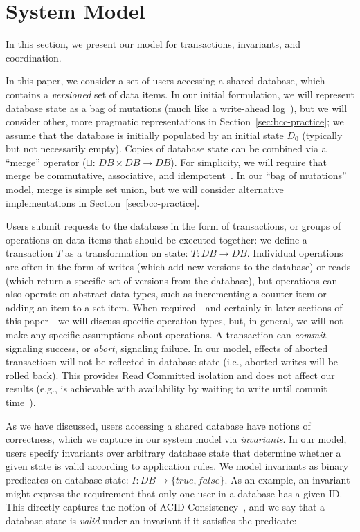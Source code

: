 
\section{System Model}
\label{sec:model}

In this section, we present our model for transactions, invariants,
and coordination.

 In this paper, we consider a set of users
accessing a shared database, which contains a \textit{versioned} set
of data items. In our initial formulation, we will represent database
state as a bag of mutations (much like a write-ahead
log~\cite{gray-book}), but we will consider other, more pragmatic
representations in Section~\ref{sec:bcc-practice}; we assume that the
database is initially populated by an initial state $D_0$ (typically
but not necessarily empty). Copies of database state can be combined
via a ``merge'' operator ($\sqcup$: $DB \times DB \rightarrow DB$).
For simplicity, we will require that merge be commutative,
associative, and idempotent~\cite{calm,crdt}. In our ``bag of
mutations'' model, merge is simple set union, but we will consider
alternative implementations in Section~\ref{sec:bcc-practice}.

 Users submit requests to the database in the
form of transactions, or groups of operations on data items that
should be executed together: we define a transaction $T$ as a
transformation on state: $T: DB \rightarrow DB$. Individual operations
are often in the form of writes (which add new versions to the
database) or reads (which return a specific set of versions from the
database), but operations can also operate on abstract data types,
such as incrementing a counter item or adding an item to a set
item. When required---and certainly in later sections of this
paper---we will discuss specific operation types, but, in general, we
will not make any specific assumptions about operations. A transaction
can \textit{commit}, signaling success, or \textit{abort}, signaling
failure. In our model, effects of aborted transactiosn will not be
reflected in database state (i.e., aborted writes will be rolled
back). This provides Read Committed isolation and does not affect our
results (e.g., is achievable with availability by waiting to write
until commit time~\cite{hat-vldb,spanner}).

 As we have discussed, users accessing a shared
database have notions of correctness, which we capture in our system
model via \textit{invariants}. In our model, users specify invariants
over arbitrary database state that determine whether a given state is
valid according to application rules. We model invariants as binary
predicates on database state: $I: DB \rightarrow \{true, false\}$.  As
an example, an invariant might express the requirement that only one
user in a database has a given ID. This directly captures the notion
of ACID Consistency~\cite{bernstein-book,gray-virtues}, and we say
that a database state is \textit{valid} under an invariant if it
satisfies the predicate:

